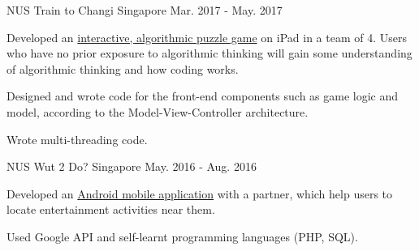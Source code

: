

\begin{cventries}

  \cventry
    {NUS} %
    {Train to Changi} %
    {Singapore} %
    {Mar. 2017 - May. 2017} %
    {
      \begin{cvitems} %
        \item {Developed an \href{https://github.com/Zhiyuan-Amos/Train-to-Changi}{interactive, algorithmic puzzle game} on iPad in a team of 4. Users who have no prior exposure to algorithmic thinking will gain some understanding of algorithmic thinking and how coding works.}
        \item {Designed and wrote code for the front-end components such as game logic and model, according to the Model-View-Controller architecture.}
        \item {Wrote multi-threading code.}
      \end{cvitems}
    }
  \cventry
    {NUS} %
    {Wut 2 Do?} %
    {Singapore} %
    {May. 2016 - Aug. 2016} %
    {
      \begin{cvitems} %
        \item {Developed an \href{https://github.com/Zhiyuan-Amos/Wut-2-Do}{Android mobile application} with a partner, which help users to locate entertainment activities near them.}
        \item {Used Google API and self-learnt programming languages (PHP, SQL).}
      \end{cvitems}
    }
\end{cventries}
